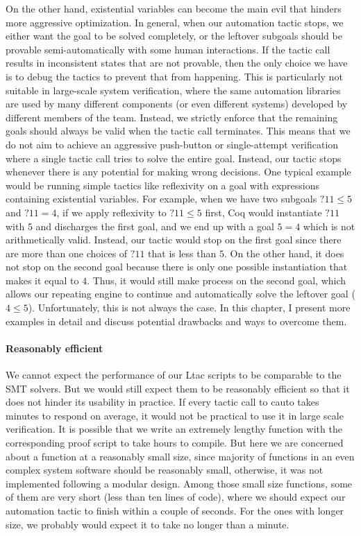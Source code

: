 On the other hand, existential variables can become the main evil that hinders
more aggressive optimization. In general, when our automation tactic stops,
we either want the goal to be solved completely, or the leftover subgoals
should be provable semi-automatically with some human interactions.
If the tactic call results in inconsistent states that are not provable,
then the only choice we have is to debug the tactics to prevent that from
happening. This is particularly not suitable in large-scale system verification,
where the same automation libraries are used by many different components
(or even different systems) developed by different members of the team.
Instead, we strictly enforce that the remaining goals should always be valid
when the tactic call terminates. This means that we do not aim to achieve
an aggressive push-button or single-attempt verification where a single tactic
call tries to solve the entire goal. Instead, our tactic stops whenever
there is any potential for making wrong decisions. One typical example would
be running simple tactics like \textsf{reflexivity} on a goal with expressions
containing existential variables. For example, when we have two subgoals
$?11\le5$ and $?11=4$, if we apply \textsf{reflexivity} to $?11\le5$ first,
Coq would instantiate $?11$ with $5$ and discharges the first goal, and
we end up with a goal $5=4$ which is not arithmetically valid. Instead,
our tactic would stop on the first goal since there are more than one choices
of $?11$ that is less than $5$. On the other hand, it does not stop on the second
goal because there is only one possible instantiation that makes it equal to $4$.
Thus, it would still make process on the second goal, which allows our repeating
engine to continue and automatically solve the leftover goal ($4\le5$).
Unfortunately, this is not always the case. In this chapter, I present
more examples in detail and discuss potential drawbacks and ways to overcome
them.


\paragraph{Reasonably efficient}

We cannot expect the performance of our Ltac scripts to be comparable
to the SMT solvers. But we would still expect them to be
reasonably efficient so that it does not hinder its usability in practice.
If every tactic call to \textsf{cauto} takes minutes to respond on average,
it would not be practical to use it in large scale verification.
It is possible that we write an extremely lengthy function with the
corresponding proof script to take hours to compile. But here we are
concerned about a function at a reasonably small size, since majority
of functions in an even complex system software should be reasonably small,
otherwise, it was not implemented following a modular design.
Among those small size functions, some of them are very short (less than
ten lines of code), where we should expect our automation tactic to
finish within a couple of seconds. For the ones with longer size,
we probably would expect it to take no longer than a minute.

